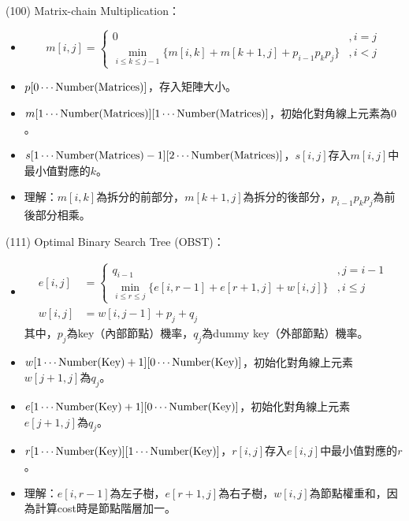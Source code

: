 \item \begin{theorem}{(100)} Matrix-chain Multiplication：\begin{itemize}
        \item \begin{equation}
            m[i, j] = \begin{cases}
                0 &, i = j \\
                \min\limits_{i \le k \le j - 1}\{m[i, k] + m[k + 1, j] + p_{i - 1}p_kp_j\} &, i < j
            \end{cases}
        \end{equation} 
        \item $p[0 \cdots \operatorname{Number}(\text{Matrices})]$，存入矩陣大小。
        \item $m[1 \cdots \operatorname{Number}(\text{Matrices})][1 \cdots \operatorname{Number}(\text{Matrices})]$，初始化對角線上元素為$0$。
        \item $s[1 \cdots \operatorname{Number}(\text{Matrices}) - 1][2 \cdots \operatorname{Number}(\text{Matrices})]$，$s[i, j]$存入$m[i, j]$中最小值對應的$k$。
        \item 理解：$m[i, k]$為拆分的前部分，$m[k + 1, j]$為拆分的後部分，$p_{i - 1}p_kp_j$為前後部分相乘。
    \end{itemize}
\end{theorem}

\item \begin{theorem}{(111)} Optimal Binary Search Tree (OBST)：\begin{itemize}
        \item \begin{equation}
            \begin{aligned}
                e[i, j] & = \begin{cases}
                    q_{i - 1} &, j = i - 1 \\
                    \min\limits_{i \le r \le j}\{e[i, r - 1] + e[r + 1, j] + w[i, j]\} &, i \le j
                \end{cases} \\
                w[i, j] & = w[i, j - 1] + p_j + q_j
            \end{aligned}
        \end{equation} 其中，$p_j$為key（內部節點）機率，$q_j$為dummy key（外部節點）機率。
        \item $w[1 \cdots \operatorname{Number}(\text{Key}) + 1][0 \cdots \operatorname{Number}(\text{Key})]$，初始化對角線上元素$w[j + 1, j]$為$q_j$。
        \item $e[1 \cdots \operatorname{Number}(\text{Key}) + 1][0 \cdots \operatorname{Number}(\text{Key})]$，初始化對角線上元素$e[j + 1, j]$為$q_j$。
        \item $r[1 \cdots \operatorname{Number}(\text{Key})][1 \cdots \operatorname{Number}(\text{Key})]$，$r[i, j]$存入$e[i, j]$中最小值對應的$r$。
        \item 理解：$e[i, r - 1]$為左子樹，$e[r + 1, j]$為右子樹，$w[i, j]$為節點權重和，因為計算cost時是節點階層加一。
    \end{itemize}
\end{theorem}
